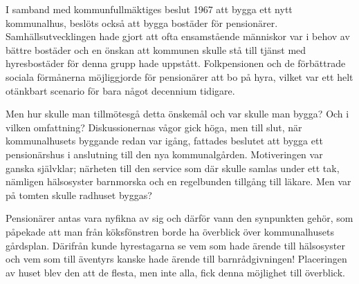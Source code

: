 %



%
I samband med kommunfullmäktiges beslut 1967 att bygga ett nytt kommunalhus, beslöts också att bygga bostäder för pensionärer. Samhällsutvecklingen hade gjort att ofta ensamstående människor var i behov av bättre bostäder och en önskan att kommunen skulle stå till tjänst med hyresbostäder för denna grupp hade uppstått. Folkpensionen och de förbättrade sociala förmånerna möjliggjorde för pensionärer att bo på hyra, vilket var ett helt otänkbart scenario för bara något decennium tidigare.

Men hur skulle man tillmötesgå detta önskemål och var skulle man bygga? Och i vilken omfattning? Diskussionernas vågor gick höga, men till slut, när kommunalhusets byggande redan var igång, fattades beslutet att bygga ett pensionärshus i anslutning till den nya kommunalgården. Motiveringen var ganska självklar; närheten till den service som där skulle samlas under ett tak, nämligen hälsosyster barnmorska och en regelbunden tillgång till läkare. Men var på tomten skulle radhuset byggas?

Pensionärer antas vara nyfikna av sig och därför vann den synpunkten gehör, som påpekade att man från köksfönstren borde ha överblick över kommunalhusets gårdsplan. Därifrån kunde hyrestagarna se vem som hade ärende till hälsosyster och vem som till äventyrs kanske hade ärende till barnrådgivningen! Placeringen av huset blev den att de flesta, men inte alla, fick denna möjlighet till överblick.

